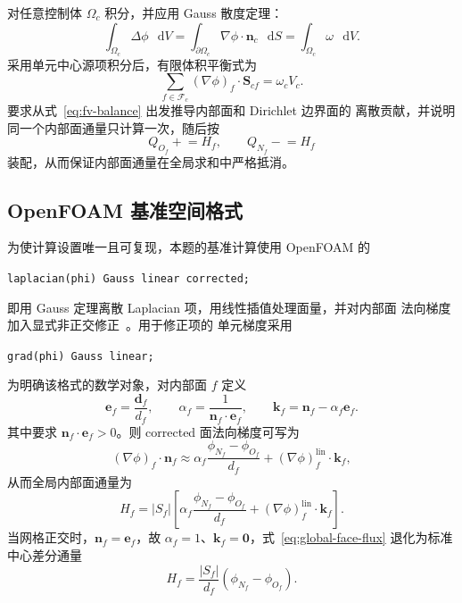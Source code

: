 \documentclass[11pt,a4paper]{ctexart}
\newcommand{\F}{\mathcal{F}}
\newcommand{\dif}{\mathop{}\!\mathrm{d}}
\begin{document}
对任意控制体 $\Omega_c$ 积分，并应用 Gauss 散度定理：
\begin{equation}
  \int_{\Omega_c}\Delta\phi\,\dif V
  =\int_{\partial\Omega_c}\nabla\phi\cdot\mathbf n_c\,\dif S
  =\int_{\Omega_c}\omega\,\dif V.
\end{equation}
采用单元中心源项积分后，有限体积平衡式为
\begin{equation}
  \sum_{f\in\F_c}
  (\nabla\phi)_f\cdot\mathbf S_{cf}
  =\omega_cV_c.
  \label{eq:fv-balance}
\end{equation}
要求从式~\eqref{eq:fv-balance} 出发推导内部面和 Dirichlet 边界面的
离散贡献，并说明同一个内部面通量只计算一次，随后按
\begin{equation}
  Q_{O_f}\mathrel{+}=H_f,
  \qquad
  Q_{N_f}\mathrel{-}=H_f
  \label{eq:owner-neighbour-assembly}
\end{equation}
装配，从而保证内部面通量在全局求和中严格抵消。

\subsection{OpenFOAM 基准空间格式}

为使计算设置唯一且可复现，本题的基准计算使用 OpenFOAM 的
\begin{center}
\texttt{laplacian(phi) Gauss linear corrected;}
\end{center}
即用 Gauss 定理离散 Laplacian 项，用线性插值处理面量，并对内部面
法向梯度加入显式非正交修正~\cite{OpenFOAMSchemes}。用于修正项的
单元梯度采用
\begin{center}
\texttt{grad(phi) Gauss linear;}
\end{center}

为明确该格式的数学对象，对内部面 $f$ 定义
\begin{equation}
  \mathbf e_f=\frac{\mathbf d_f}{d_f},
  \qquad
  \alpha_f=\frac{1}{\mathbf n_f\cdot\mathbf e_f},
  \qquad
  \mathbf k_f=\mathbf n_f-\alpha_f\mathbf e_f.
  \label{eq:nonorth-decomp}
\end{equation}
其中要求 $\mathbf n_f\cdot\mathbf e_f>0$。则 corrected
面法向梯度可写为
\begin{equation}
  (\nabla\phi)_f\cdot\mathbf n_f
  \approx
  \alpha_f\frac{\phi_{N_f}-\phi_{O_f}}{d_f}
  +(\nabla\phi)_f^{\mathrm{lin}}\cdot\mathbf k_f,
  \label{eq:corrected-sngrad}
\end{equation}
从而全局内部面通量为
\begin{equation}
  H_f
  =|S_f|\left[
  \alpha_f\frac{\phi_{N_f}-\phi_{O_f}}{d_f}
  +(\nabla\phi)_f^{\mathrm{lin}}\cdot\mathbf k_f
  \right].
  \label{eq:global-face-flux}
\end{equation}
当网格正交时，$\mathbf n_f=\mathbf e_f$，故
$\alpha_f=1$、$\mathbf k_f=\mathbf0$，式~\eqref{eq:global-face-flux}
退化为标准中心差分通量
\begin{equation}
  H_f=\frac{|S_f|}{d_f}
  (\phi_{N_f}-\phi_{O_f}).
\end{equation}
\end{document}
